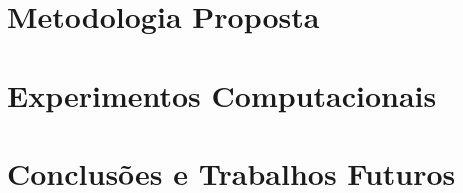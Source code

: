 \documentclass[a4paper,12pt,oneside,openany]{book}
\begin{document}
\chapter{Metodologia Proposta}
\label{cap:implementacao}


\chapter{Experimentos Computacionais}
\label{cap:experimentos}


\chapter{Conclus\~oes e Trabalhos Futuros}
\label{cap:conclusao}


\normalsize
\cleardoublepage
{}



\backmatter
\end{document}

